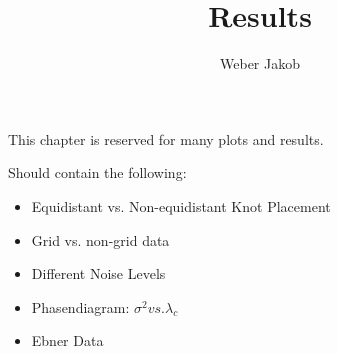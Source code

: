 \documentclass[10pt,a4paper]{article}
\title{Results}
\author{Weber Jakob}
\begin{document}
	\maketitle
	
This chapter is reserved for many plots and results.

Should contain the following: 

\begin{itemize}
	\item Equidistant vs. Non-equidistant Knot Placement
	\item Grid vs. non-grid data
	\item Different Noise Levels
	\item Phasendiagram: $\sigma^2 vs. \lambda_c$
	\item Ebner Data
\end{itemize}

	
\end{document}
